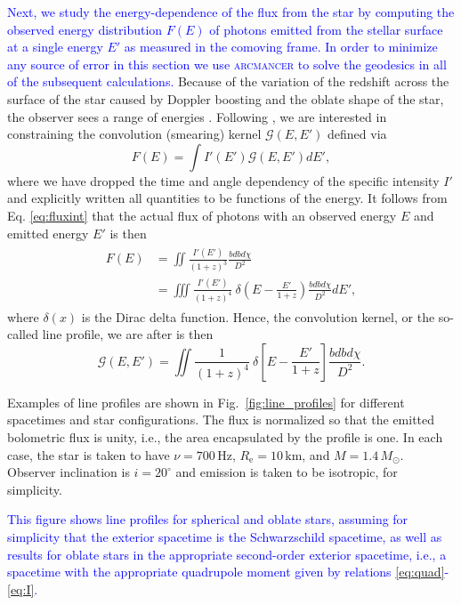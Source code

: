 \documentclass{aa}
\newcommand{\be}{\begin{equation}}
\newcommand{\ee}{\end{equation}}
\newcommand{\refe}[1]{\textcolor{blue}{{#1}}}
\newcommand{\refedel}[1]{}
\newcommand{\sch}{Schwarzschild }
\newcommand{\Msun}{\ensuremath{M_{\odot}}}
\begin{document}
\refe{Next, we study the energy-dependence of the flux from the star by computing the observed energy distribution $F(E)$ of photons emitted from the stellar surface at a single energy $E'$ as measured in the comoving frame.}
\refe{In order to minimize any source of error in this section we use \textsc{arcmancer} to solve the geodesics in all of the subsequent calculations.}
Because of the variation of the redshift across the surface of the star caused by Doppler boosting and the oblate shape of the star, the observer sees a range of energies \citep{OP03,BML06,CMB06}.
Following \citealt{Baubock15}, we are interested in constraining the convolution (smearing) kernel $\mathcal{G}(E,E')$ defined via
\be
F(E) = \int I'(E') \mathcal{G}(E,E') dE',
\ee
where we have dropped the time and angle dependency of the specific intensity $I'$ and explicitly written all quantities to be functions of the energy.
It follows from Eq. \eqref{eq:fluxint} that the actual flux of photons with an observed energy $E$ and emitted energy $E'$ is then
\begin{align}\begin{split}
    F(E) &= \iint \frac{ I'(E') }{ (1+z)^3 } \frac{bdb d\chi}{D^2} \\
         &= \iiint \frac{I'(E') }{(1+z)^4} ~ \delta \left( E - \frac{E'}{1+z} \right)  \frac{bdb d\chi}{D^2} dE',
\end{split}\end{align}
where $\delta(x)$ is the Dirac delta function.
Hence, the convolution kernel, or the so-called line profile, we are after is then 
\be
\mathcal{G}(E,E') =  \iint \frac{1}{(1+z)^4} ~\delta \left[E - \frac{E'}{1+z} \right]  \frac{bdb d\chi}{D^2}.
\ee

Examples of line profiles are shown in Fig.~\ref{fig:line_profiles} for different spacetimes and star configurations.
The flux is normalized so that the emitted bolometric flux is unity, i.e., the area encapsulated by the profile is one.
In each case, the star is taken to have $\nu = 700\,\mathrm{Hz}$, $R_{\mathrm{e}} = 10\,\mathrm{km}$, and $M=1.4\,\Msun$.
Observer inclination is $i=20^{\circ}$ and emission is taken to be isotropic, for simplicity.
\refedel{We consider a \sch spacetime for spherical and oblate stars, with radius given by Eq.~\eqref{eq:radf}, in addition to a full second-order spacetime with quadrupole moments and an oblate neutron star surface.}
\refe{This figure shows line profiles for spherical and oblate stars, assuming for simplicity that the exterior spacetime is the Schwarzschild spacetime, as well as results for oblate stars in the appropriate second-order exterior spacetime, 
i.e., a spacetime with the appropriate quadrupole moment given by relations \eqref{eq:quad}-\eqref{eq:I}.
}
\end{document}
